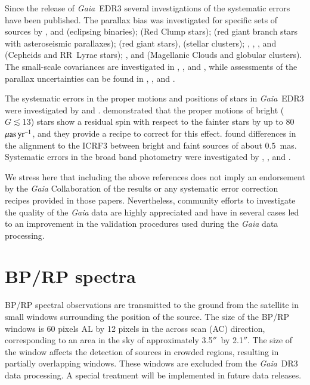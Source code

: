 \documentclass[longauth]{aa}
\def\arcsec{\ensuremath{''}}
\providecommand{\bprp}{BP/RP\xspace}
\providecommand\muasyr{\ensuremath{\mu\text{as\,yr}^{-1}}}
\newcommand\gaia{\textit{Gaia}\xspace}
\providecommand\gdrthree{\textit{Gaia}~DR3\xspace}
\providecommand\gedr[1]{\textit{Gaia}~EDR#1\xspace}
\begin{document}
Since the release of \gedr{3} several investigations of the systematic errors have been published.  The parallax bias was investigated for specific sets of sources by \cite{2021ApJ...907L..33S}, and \cite{2021ApJ...911L..20R} (eclipsing binaries); \cite{2021ApJ...910L...5H} (Red Clump stars); \cite{2021AJ....161..214Z} (red giant branch stars with asteroseismic parallaxes); \cite{2022AJ....163..149W} (red giant stars), \cite{2022MNRAS.509.4276F} (stellar clusters); \cite{2021A&A...654A..20G}, \cite{2021A&A...653A..61K}, \cite{2021ApJ...908L...6R}, and \cite{2022MNRAS.509.2566M} (Cepheids and RR~Lyrae stars); \cite{2022A&A...657A.130M}, and \cite{2021A&A...649A..13M} (Magellanic Clouds and globular clusters). The small-scale covariances are investigated in \citet{2021AJ....161..214Z}, \citet{2021MNRAS.505.5978V}, and  \citet{2021A&A...649A..13M}, while assessments of the parallax uncertainties can be found in \cite{2021MNRAS.506.2269E},  \cite{2021MNRAS.505.5978V}, and \cite{2021A&A...649A..13M}.

The systematic errors in the proper motions and positions of stars in \gedr{3} were investigated by \cite{2021A&A...649A.124C} and \cite{2021EGUGA..23.8604L}. \cite{2021A&A...649A.124C} demonstrated that the proper motions of bright ($G\lesssim13$) stars show  a residual spin with respect to the fainter stars by up to $80$~\muasyr, and they provide a recipe to correct for this effect. \cite{2021EGUGA..23.8604L} found differences in the alignment to the ICRF3 between bright and faint sources of about $0.5$~mas.  Systematic errors in the broad band photometry were investigated by \cite{2021ApJ...908L..14N}, \cite{2021ApJ...908L..24Y}, and \cite{2021MNRAS.505.5941T}.

We stress here that including the above references does not imply an endorsement by the \gaia Collaboration of the results or any systematic error correction recipes provided in those papers. Nevertheless, community efforts to investigate the quality of the \gaia data are highly appreciated and have in several cases led to an improvement in the validation procedures used during the \gaia data processing.


\section{\bprp spectra}\label{ssec:photspectra}
 
\bprp  spectral observations are  transmitted to the ground from the satellite in small windows  surrounding the position of the source. The size of the \bprp windows is 60 pixels AL by 12 pixels in the across scan (AC) direction, corresponding to an area in the sky of approximately 3.5\arcsec\ by 2.1\arcsec. The size of the window affects the detection of sources in crowded regions, resulting in  partially overlapping windows. These windows are excluded from the \gdrthree data processing. A special treatment will be implemented in future data releases.
\end{document}

